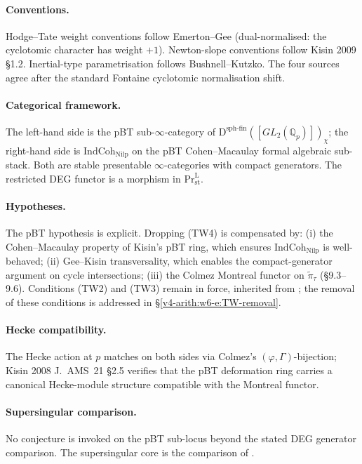 \paragraph{Conventions.} Hodge--Tate weight conventions follow Emerton--Gee
(dual-normalised: the cyclotomic character has weight \(+1\)). Newton-slope
conventions follow Kisin 2009 \S 1.2. Inertial-type parametrisation follows
Bushnell--Kutzko. The four sources agree after the standard Fontaine
cyclotomic normalisation shift.

\paragraph{Categorical framework.} The left-hand side is the pBT
sub-\(\infty\)-category of
\(\mathrm{D}^{\mathrm{sph\text{-}fin}}([GL_{2}(\mathbb{Q}_{p})])_{\chi}\);
the right-hand side is \(\mathrm{IndCoh}_{\mathrm{Nilp}}\) on the pBT
Cohen--Macaulay formal algebraic sub-stack. Both are stable presentable
\(\infty\)-categories with compact generators. The restricted DEG functor
is a morphism in \(\mathrm{Pr}^{\mathrm{L}}_{\mathrm{st}}\).

\paragraph{Hypotheses.} The pBT hypothesis is explicit. Dropping (TW4) is
compensated by: (i) the Cohen--Macaulay property of Kisin's pBT ring, which
ensures \(\mathrm{IndCoh}_{\mathrm{Nilp}}\) is well-behaved; (ii)
Gee--Kisin transversality, which enables the compact-generator argument on
cycle intersections; (iii) the Colmez Montreal functor on
\(\widetilde{\pi}_{\tau}\) (\S 9.3--9.6). Conditions (TW2) and (TW3)
remain in force, inherited from ; the removal
of these conditions is addressed in \S\ref{v4-arith:w6-e:TW-removal}.

\paragraph{Hecke compatibility.} The Hecke action at \(p\) matches on both
sides via Colmez's \((\varphi,\Gamma)\)-bijection; Kisin 2008 J.~AMS~21
\S 2.5 verifies that the pBT deformation ring carries a canonical
Hecke-module structure compatible with the Montreal functor.

\paragraph{Supersingular comparison.} No conjecture is invoked on the
pBT sub-locus beyond the stated DEG generator comparison. The
supersingular core is the comparison of
.

